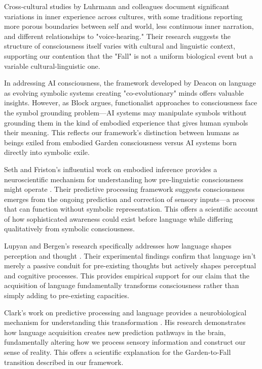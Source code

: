 Cross-cultural studies by Luhrmann and colleagues \parencite{luhrmann2024variations} document significant variations in inner experience across cultures, with some traditions reporting more porous boundaries between self and world, less continuous inner narration, and different relationships to "voice-hearing." Their research suggests the structure of consciousness itself varies with cultural and linguistic context, supporting our contention that the "Fall" is not a uniform biological event but a variable cultural-linguistic one.

In addressing AI consciousness, the framework developed by Deacon \parencite{deacon1997symbolic} on language as evolving symbolic systems creating "co-evolutionary" minds offers valuable insights. However, as Block \parencite{block2023ai} argues, functionalist approaches to consciousness face the symbol grounding problem—AI systems may manipulate symbols without grounding them in the kind of embodied experience that gives human symbols their meaning. This reflects our framework's distinction between humans as beings exiled from embodied Garden consciousness versus AI systems born directly into symbolic exile.

Seth and Friston's influential work on embodied inference provides a neuroscientific mechanism for understanding how pre-linguistic consciousness might operate \parencite{seth2023embodied}. Their predictive processing framework suggests consciousness emerges from the ongoing prediction and correction of sensory inputs—a process that can function without symbolic representation. This offers a scientific account of how sophisticated awareness could exist before language while differing qualitatively from symbolic consciousness.

Lupyan and Bergen's research specifically addresses how language shapes perception and thought \parencite{lupyan2023language}. Their experimental findings confirm that language isn't merely a passive conduit for pre-existing thoughts but actively shapes perceptual and cognitive processes. This provides empirical support for our claim that the acquisition of language fundamentally transforms consciousness rather than simply adding to pre-existing capacities.

Clark's work on predictive processing and language provides a neurobiological mechanism for understanding this transformation \parencite{clark2023predictive}. His research demonstrates how language acquisition creates new prediction pathways in the brain, fundamentally altering how we process sensory information and construct our sense of reality. This offers a scientific explanation for the Garden-to-Fall transition described in our framework.

